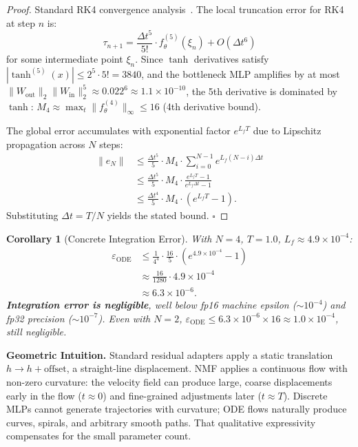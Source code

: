 \documentclass{scpe}
\newtheorem{corollary}[theorem]{Corollary}
\begin{document}
\begin{proof}
Standard RK4 convergence analysis~\cite{butcher2016numerical,hairer1993solving}. The local truncation error for RK4 at step $n$ is:
\begin{equation}
\tau_{n+1} = \frac{\Delta t^5}{5!} \cdot f_\theta^{(5)}(\xi_n) + O(\Delta t^6)
\end{equation}
for some intermediate point $\xi_n$. Since $\tanh$ derivatives satisfy $|\tanh^{(5)}(x)| \leq 2^5 \cdot 5! = 3840$, and the bottleneck MLP amplifies by at most $\|W_{\text{out}}\|_2\|W_{\text{in}}\|_2^5 \approx 0.022^6 \approx 1.1\times 10^{-10}$, the 5th derivative is dominated by $\tanh$: $M_4 \approx \max_t \|f_\theta^{(4)}\|_\infty \leq 16$ (4th derivative bound).

The global error accumulates with exponential factor $e^{L_f T}$ due to Lipschitz propagation across $N$ steps:
\begin{align}
\|e_N\| &\leq \frac{\Delta t^5}{5} \cdot M_4 \cdot \sum_{i=0}^{N-1} e^{L_f (N-i)\Delta t} \nonumber\\
&\leq \frac{\Delta t^5}{5} \cdot M_4 \cdot \frac{e^{L_f T} - 1}{e^{L_f \Delta t} - 1} \nonumber\\
&\leq \frac{\Delta t^4}{5} \cdot M_4 \cdot (e^{L_f T} - 1).
\end{align}
Substituting $\Delta t = T/N$ yields the stated bound. $\square$
\end{proof}

\begin{corollary}[Concrete Integration Error]
With $N=4$, $T=1.0$, $L_f \approx 4.9\times 10^{-4}$:
\begin{align}
\varepsilon_{\text{ODE}} &\leq \frac{1}{4^4} \cdot \frac{16}{5} \cdot (e^{4.9\times 10^{-4}} - 1) \nonumber\\
&\approx \frac{16}{1280} \cdot 4.9\times 10^{-4} \nonumber\\
&\approx 6.3 \times 10^{-6}.
\end{align}
\textbf{Integration error is negligible}, well below fp16 machine epsilon ($\sim 10^{-4}$) and fp32 precision ($\sim 10^{-7}$). Even with $N=2$, $\varepsilon_{\text{ODE}} \leq 6.3\times 10^{-6} \times 16 \approx 1.0\times 10^{-4}$, still negligible.
\end{corollary}

\textbf{Geometric Intuition.} Standard residual adapters apply a static translation $h \to h + \text{offset}$, a straight-line displacement. NMF applies a continuous flow with non-zero curvature: the velocity field can produce large, coarse displacements early in the flow ($t \approx 0$) and fine-grained adjustments later ($t \approx T$). Discrete MLPs cannot generate trajectories with curvature; ODE flows naturally produce curves, spirals, and arbitrary smooth paths. That qualitative expressivity compensates for the small parameter count.
\end{document}
